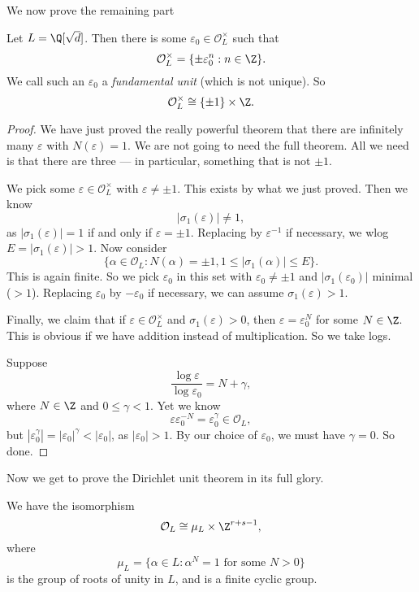 \documentclass[a4paper]{article}
\begin{document}
We now prove the remaining part
\begin{thm}
  Let $L = \Q[\sqrt{d}]$. Then there is some $\varepsilon_0 \in \mathcal{O}_L^\times$ such that
  \[
    \mathcal{O}_L^\times = \{\pm \varepsilon_0^n : n \in \Z\}.
  \]
  We call such an $\varepsilon_0$ a \emph{fundamental unit} (which is not unique). So
  \[
    \mathcal{O}_L^\times \cong \{\pm 1\} \times \Z.
  \]
\end{thm}

\begin{proof}
  We have just proved the really powerful theorem that there are infinitely many $\varepsilon$ with $N(\varepsilon) = 1$. We are not going to need the full theorem. All we need is that there are three --- in particular, something that is not $\pm 1$.

  We pick some $\varepsilon \in \mathcal{O}_L^\times$ with $\varepsilon \not= \pm 1$. This exists by what we just proved. Then we know
  \[
    |\sigma_1(\varepsilon)| \not= 1,
  \]
  as $|\sigma_1(\varepsilon)| = 1$ if and only if $\varepsilon = \pm 1$. Replacing by $\varepsilon^{-1}$ if necessary, we wlog $E = |\sigma_1(\varepsilon)| > 1$. Now consider
  \[
    \{\alpha \in \mathcal{O}_L: N(\alpha) = \pm 1, 1 \leq |\sigma_1(\alpha)| \leq E\}.
  \]
  This is again finite. So we pick $\varepsilon_0$ in this set with $\varepsilon_0 \not= \pm 1$ and $|\sigma_1(\varepsilon_0)|$ minimal ($> 1$). Replacing $\varepsilon_0$ by $-\varepsilon_0$ if necessary, we can assume $\sigma_1(\varepsilon) > 1$.

  Finally, we claim that if $\varepsilon \in \mathcal{O}_L^\times$ and $\sigma_1(\varepsilon) > 0$, then $\varepsilon = \varepsilon_0^N$ for some $N \in \Z$. This is obvious if we have addition instead of multiplication. So we take logs.

  Suppose
  \[
    \frac{\log \varepsilon}{\log \varepsilon_0} = N + \gamma,
  \]
  where $N \in \Z$ and $0 \leq \gamma < 1$. Yet we know
  \[
    \varepsilon\varepsilon_0^{-N} = \varepsilon_0^\gamma \in \mathcal{O}_L,
  \]
  but $|\varepsilon_0^\gamma| = |\varepsilon_0|^\gamma < |\varepsilon_0|$, as $|\varepsilon_0| > 1$. By our choice of $\varepsilon_0$, we must have $\gamma = 0$. So done.
\end{proof}

Now we get to prove the Dirichlet unit theorem in its full glory.
\begin{thm}
  We have the isomorphism
  \[
    \mathcal{O}_L \cong \mu_L \times \Z^{r + s - 1},
  \]
  where
  \[
    \mu_L = \{\alpha \in L: \alpha^N = 1\text{ for some }N > 0\}
  \]
  is the group of roots of unity in $L$, and is a finite cyclic group.
\end{thm}
\end{document}
